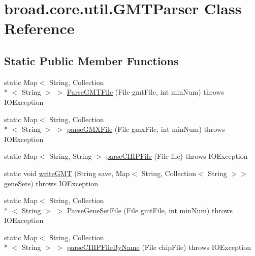 \hypertarget{classbroad_1_1core_1_1util_1_1_g_m_t_parser}{\section{broad.\+core.\+util.\+G\+M\+T\+Parser Class Reference}
\label{classbroad_1_1core_1_1util_1_1_g_m_t_parser}
}
\subsection*{Static Public Member Functions}
\begin{DoxyCompactItemize}
\item 
static Map$<$ String, Collection\\*
$<$ String $>$ $>$ \hyperlink{classbroad_1_1core_1_1util_1_1_g_m_t_parser_a197d17bca06419a3e1145b7dd0d82bfa}{Parse\+G\+M\+T\+File} (File gmt\+File, int min\+Num)  throws I\+O\+Exception
\item 
static Map$<$ String, Collection\\*
$<$ String $>$ $>$ \hyperlink{classbroad_1_1core_1_1util_1_1_g_m_t_parser_a64d2ba035fa2e029a878dc9216806302}{parse\+G\+M\+X\+File} (File gmx\+File, int min\+Num)  throws I\+O\+Exception
\item 
static Map$<$ String, String $>$ \hyperlink{classbroad_1_1core_1_1util_1_1_g_m_t_parser_a506147b5b39d21592aa81d6031701217}{parse\+C\+H\+I\+P\+File} (File file)  throws I\+O\+Exception
\item 
static void \hyperlink{classbroad_1_1core_1_1util_1_1_g_m_t_parser_a80713bdc4749dd02dfe4a184d1016a90}{write\+G\+M\+T} (String save, Map$<$ String, Collection$<$ String $>$$>$ gene\+Sets)  throws I\+O\+Exception
\item 
static Map$<$ String, Collection\\*
$<$ String $>$ $>$ \hyperlink{classbroad_1_1core_1_1util_1_1_g_m_t_parser_ada90335b04f8b5cbf626bac3242f5698}{Parse\+Gene\+Set\+File} (File gmt\+File, int min\+Num)  throws I\+O\+Exception 
\item 
static Map$<$ String, Collection\\*
$<$ String $>$ $>$ \hyperlink{classbroad_1_1core_1_1util_1_1_g_m_t_parser_a8636346b4b239a15522d4988cb7d30cb}{parse\+C\+H\+I\+P\+File\+By\+Name} (File chip\+File)  throws I\+O\+Exception 
\end{DoxyCompactItemize}



